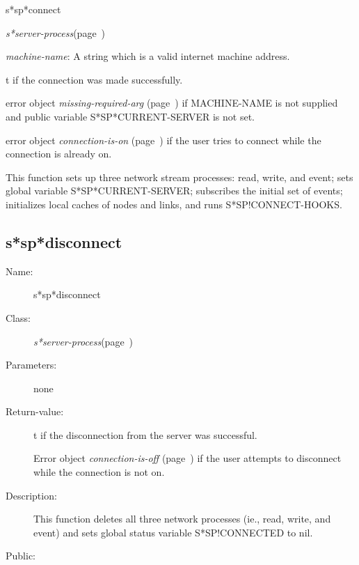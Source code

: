 \begin{description}
\item [Name:]  s*sp*connect

\item [Class:] {\sl s*server-process}\hfill(page~\pageref{s*server-process})

\item [Parameters:]
\item {\sl machine-name}:  
A string which is a valid internet machine address. 
	 

\item [Return-value:] 
t if the connection was made successfully.

error object {\sl missing-required-arg} (page~\pageref{missing-required-arg}) if MACHINE-NAME is
not supplied and public variable S*SP*CURRENT-SERVER is not
set. 

error object {\sl connection-is-on} (page~\pageref{connection-is-on}) if the user tries to 
connect while the connection is already on.

\item [Description:]
This function sets up three network stream processes:
read, write, and event; sets global variable
S*SP*CURRENT-SERVER; subscribes the initial set of
events; initializes local caches of nodes and links, and
runs S*SP!CONNECT-HOOKS.


\item [Public:]






\end{description}
\horizontalline

\subsection{s*sp*disconnect}
\label{s*sp*disconnect}

\begin{description}

\item [Name:]  s*sp*disconnect

\item [Class:] {\sl s*server-process}\hfill(page~\pageref{s*server-process})

\item [Parameters:] none

\item [Return-value:]
t if the disconnection from the server was successful.

Error object {\sl connection-is-off} (page~\pageref{connection-is-off}) if the user
attempts to disconnect while the connection is not on. 


\item [Description:]
This function deletes all three network processes (ie.,
read, write, and event) and sets global status variable
S*SP!CONNECTED to nil.

\item [Public:]




\end{description}
\horizontalline

